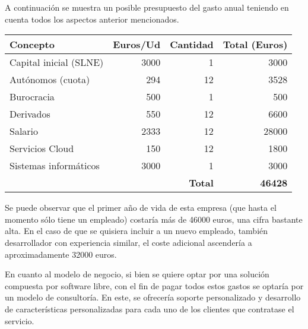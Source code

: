 A continuación se muestra un posible presupuesto del gasto anual teniendo en cuenta todos los aspectos anterior mencionados.

\begin{table}[H]
    \centering
    \def\arraystretch{1.25}
    \begin{adjustbox}{max width=\textwidth}
    \begin{tabularx}{\textwidth}{|l|r|r|r|}
    \hline
        \textbf{Concepto} & \textbf{Euros/Ud} & \textbf{Cantidad} & \textbf{Total (Euros)} \\ \hline
    \hline
        Capital inicial (SLNE) & 3000 & 1 & 3000 \\ \hline
        Autónomos (cuota) & 294 & 12 & 3528 \\ \hline
        Burocracia & 500 & 1 & 500 \\ \hline
        Derivados & 550 & 12 & 6600 \\ \hline
        Salario & 2333 & 12 & 28000 \\ \hline
        Servicios Cloud & 150 & 12 & 1800 \\ \hline
        Sistemas informáticos & 3000 & 1 & 3000 \\ \hline
        \hline
        \multicolumn{3}{|r|}{\textbf{Total}} & \textbf{46428} \\ \hline
    \end{tabularx}
    \end{adjustbox}
\end{table}

Se puede observar que el primer año de vida de esta empresa (que hasta el momento sólo tiene un empleado) costaría más de 46000 euros, una cifra bastante alta. En el caso de que se quisiera incluir a un nuevo empleado, también desarrollador con experiencia similar, el coste adicional ascendería a aproximadamente 32000 euros.

En cuanto al modelo de negocio, si bien se quiere optar por una solución compuesta por software libre, con el fin de pagar todos estos gastos se optaría por un modelo de consultoría. En este, se ofrecería soporte personalizado y desarrollo de características personalizadas para cada uno de los clientes que contratase el servicio.


